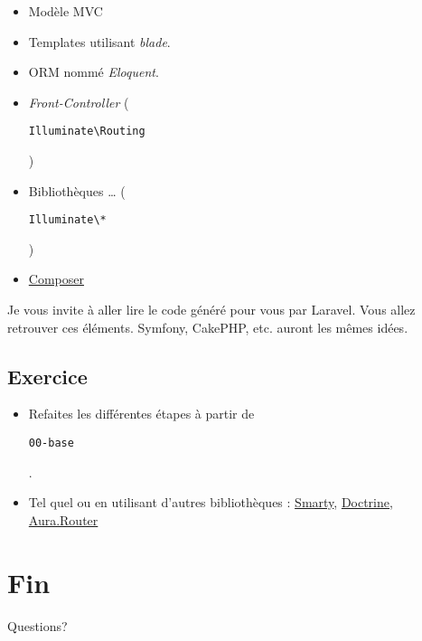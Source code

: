 \begin{itemize}
\tightlist
\item
  Modèle MVC
\item
  Templates utilisant \emph{blade}.
\item
  ORM nommé \emph{Eloquent}.
\item
  \emph{Front-Controller}
  (\begin{otherlanguage}{english}\texttt{Illuminate\textbackslash{}Routing}\end{otherlanguage})
\item
  Bibliothèques \ldots{}
  (\begin{otherlanguage}{english}\texttt{Illuminate\textbackslash{}*}\end{otherlanguage})
\item
  \href{http://getcomposer.org/}{Composer}
\end{itemize}

Je vous invite à aller lire le code généré pour vous par Laravel. Vous
allez retrouver ces éléments. Symfony, CakePHP, etc. auront les mêmes
idées.

\hypertarget{exercice}{%
\subsection{Exercice}\label{exercice}}

\begin{itemize}
\tightlist
\item
  Refaites les différentes étapes à partir de
  \begin{otherlanguage}{english}\texttt{00-base}\end{otherlanguage}.
\item
  Tel quel ou en utilisant d'autres bibliothèques :
  \href{https://github.com/smarty-php/smarty}{Smarty},
  \href{https://www.doctrine-project.org/projects/doctrine-orm/en/current/tutorials/getting-started.html}{Doctrine},
  \href{https://github.com/auraphp/Aura.Router}{Aura.Router}
\end{itemize}

\hypertarget{fin}{%
\section{Fin}\label{fin}}

Questions?

\begin{otherlanguage}{english}

\end{otherlanguage}

